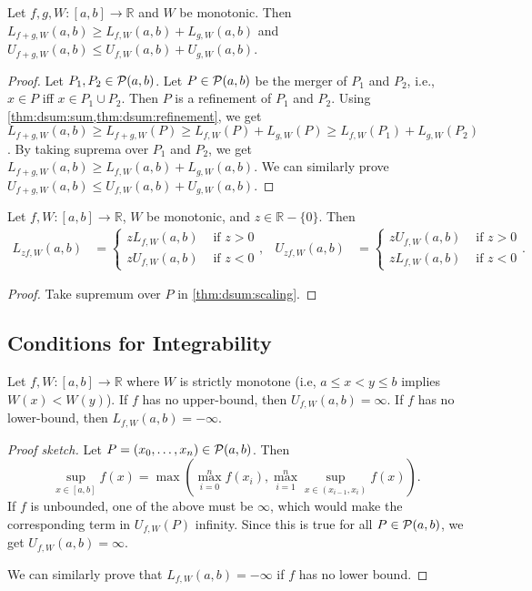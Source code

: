 \documentclass[a4paper,12pt,fleqn]{article}
\begin{document}
\begin{lemma}
\label{thm:dint:sum}
Let $f, g, W: [a, b] \to \mathbb{R}$ and $W$ be monotonic.
Then $L_{f+g,W}(a, b) \ge L_{f,W}(a, b) + L_{g,W}(a, b)$
and $U_{f+g,W}(a, b) \le U_{f,W}(a, b) + U_{g,W}(a, b)$.
\end{lemma}
\begin{proof}
Let $P_1, P_2 \in \mathcal{P}(a, b)$.
Let $P \in \mathcal{P}(a, b)$ be the merger of $P_1$ and $P_2$,
i.e., $x \in P$ iff $x \in P_1 \cup P_2$.
Then $P$ is a refinement of $P_1$ and $P_2$.
Using \cref{thm:dsum:sum,thm:dsum:refinement}, we get
$L_{f+g,W}(a, b) \ge L_{f+g,W}(P) \ge L_{f,W}(P) + L_{g,W}(P) \ge L_{f,W}(P_1) + L_{g,W}(P_2)$.
By taking suprema over $P_1$ and $P_2$, we get
$L_{f+g,W}(a, b) \ge L_{f,W}(a, b) + L_{g,W}(a, b)$.
We can similarly prove $U_{f+g,W}(a, b) \le U_{f,W}(a, b) + U_{g,W}(a, b)$.
\end{proof}

\begin{lemma}
\label{thm:dint:scaling}
Let $f, W: [a, b] \to \mathbb{R}$, $W$ be monotonic, and $z \in \mathbb{R} - \{0\}$. Then
\begin{align*}
L_{zf,W}(a, b) &= \begin{cases}
    zL_{f,W}(a, b) & \text{ if } z > 0
    \\ zU_{f,W}(a, b) & \text{ if } z < 0
\end{cases},
& U_{zf,W}(a, b) &= \begin{cases}
    zU_{f,W}(a, b) & \text{ if } z > 0
    \\ zL_{f,W}(a, b) & \text{ if } z < 0
\end{cases}.
\end{align*}
\end{lemma}
\begin{proof}
Take supremum over $P$ in \cref{thm:dsum:scaling}.
\end{proof}

\subsection{Conditions for Integrability}

\begin{lemma}
\label{thm:dint:unbounded}
Let $f, W: [a, b] \to \mathbb{R}$ where $W$ is strictly monotone
(i.e, $a \le x < y \le b$ implies $W(x) < W(y)$).
If $f$ has no upper-bound, then $U_{f,W}(a, b) = \infty$.
If $f$ has no lower-bound, then $L_{f,W}(a, b) = -\infty$.
\end{lemma}
\begin{proof}[Proof sketch]
Let $P = (x_0, \ldots, x_n) \in \mathcal{P}(a, b)$. Then
\[ \sup_{x \in [a, b]} f(x) = \max\left(\max_{i=0}^n f(x_i),
    \max_{i=1}^n\sup_{x \in (x_{i-1}, x_i)} f(x)\right). \]
If $f$ is unbounded, one of the above must be $\infty$,
which would make the corresponding term in $U_{f,W}(P)$ infinity.
Since this is true for all $P \in \mathcal{P}(a, b)$, we get $U_{f,W}(a, b) = \infty$.

We can similarly prove that $L_{f,W}(a, b) = -\infty$ if $f$ has no lower bound.
\end{proof}
\end{document}
